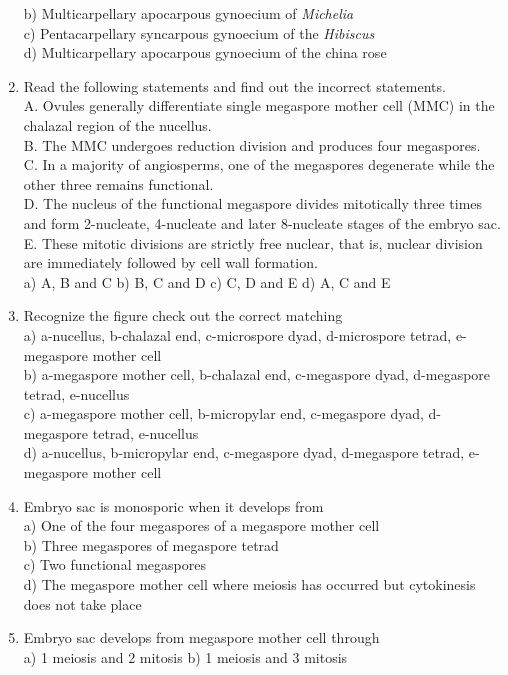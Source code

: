 \begin{enumerate}
  b) Multicarpellary apocarpous gynoecium of \emph{Michelia}\\
  c) Pentacarpellary syncarpous gynoecium of the \emph{Hibiscus}\\
  d) Multicarpellary apocarpous gynoecium of the china rose
\item
  Read the following statements and find out the incorrect statements.\\
  A. Ovules generally differentiate single megaspore mother cell (MMC)
  in the chalazal region of the nucellus.\\
  B. The MMC undergoes reduction division and produces four
  megaspores.\\
  C. In a majority of angiosperms, one of the megaspores degenerate
  while the other three remains functional.\\
  D. The nucleus of the functional megaspore divides mitotically three
  times and form 2-nucleate, 4-nucleate and later 8-nucleate stages of
  the embryo sac.\\
  E. These mitotic divisions are strictly free nuclear, that is, nuclear
  division are immediately followed by cell wall formation.\\
  a) A, B and C b) B, C and D c) C, D and E d) A, C and E
\item
  Recognize the figure check out the correct matching\\
  a) a-nucellus, b-chalazal end, c-microspore dyad, d-microspore tetrad,
  e-megaspore mother cell\\
  b) a-megaspore mother cell, b-chalazal end, c-megaspore dyad,
  d-megaspore tetrad, e-nucellus\\
  c) a-megaspore mother cell, b-micropylar end, c-megaspore dyad,
  d-megaspore tetrad, e-nucellus\\
  d) a-nucellus, b-micropylar end, c-megaspore dyad, d-megaspore tetrad,
  e-megaspore mother cell
\item
  Embryo sac is monosporic when it develops from\\
  a) One of the four megaspores of a megaspore mother cell\\
  b) Three megaspores of megaspore tetrad\\
  c) Two functional megaspores\\
  d) The megaspore mother cell where meiosis has occurred but
  cytokinesis does not take place
\item
  Embryo sac develops from megaspore mother cell through\\
  a) 1 meiosis and 2 mitosis b) 1 meiosis and 3 mitosis\\

\end{enumerate}
